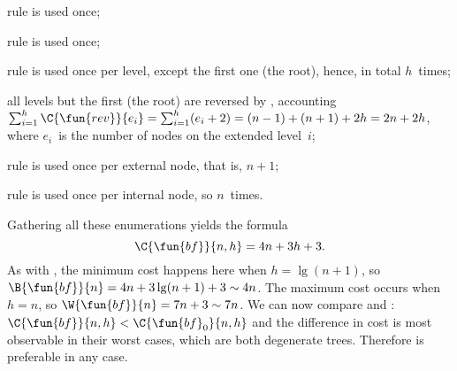 \begin{itemize*}

  \item rule \clause{\nu} is used once;

  \item rule \clause{\xi} is used once;

  \item rule \clause{\pi} is used once per level, except the first one
    (the root), hence, in total \(h\)~times;

  \item all levels but the first (the root) are reversed by
    , accounting \(\sum_{i=1}^{h}\C{\fun{rev}}{e_i} =
    \sum_{i=1}^{h}(e_i+2) = (n-1)+(n+1)+ 2h = 2n +
    2h\), where \(e_i\)~is the number of
    nodes on the extended level~\(i\);

  \item rule \clause{\rho} is used once per external node, that is,
    \(n+1\);

  \item rule \clause{\sigma} is used once per internal node, so
    \(n\)~times.

\end{itemize*}
Gathering all these enumerations yields the formula
\begin{equation*}
\C{\fun{bf}}{n,h} = 4n + 3h + 3.\index{bf@$\C{\fun{bf}}{n,h}$}
\end{equation*}
As with , the minimum cost
happens here when \(h = \lg(n+1)\), so \(\B{\fun{bf}}{n} = 4n +
3\lg(n+1) + 3 \sim 4n\). The maximum
cost occurs when \(h=n\), so \(\W{\fun{bf}}{n} = 7n + 3 \sim 7n\). We
can now compare  and
: \(\C{\fun{bf}}{n,h} <
\C{\fun{bf}_0}{n,h}\)
 and the difference in cost is most
observable in their worst cases, which are both degenerate
trees. Therefore  is preferable in any case.


